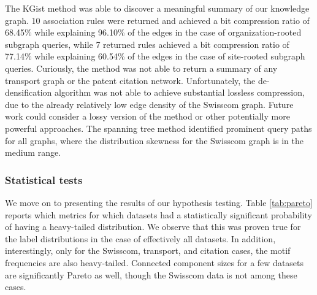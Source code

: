 The KGist method was able to discover a meaningful summary of our knowledge graph. 10 association rules were returned and achieved a bit compression ratio of 68.45\% while explaining 96.10\% of the edges in the case of organization-rooted subgraph queries, while 7 returned rules achieved a bit compression ratio of 77.14\% while explaining 60.54\% of the edges in the case of site-rooted subgraph queries. Curiously, the method was not able to return a summary of any transport graph or the patent citation network. Unfortunately, the de-densification algorithm was not able to achieve substantial lossless compression, due to the already relatively low edge density of the Swisscom graph. Future work could consider a lossy version of the method or other potentially more powerful approaches. The spanning tree method identified prominent query paths for all graphs, where the distribution skewness for the Swisscom graph is in the medium range.

\subsubsection{Statistical tests}

We move on to presenting the results of our hypothesis testing. Table \ref{tab:pareto} reports which metrics for which datasets had a statistically significant probability of having a heavy-tailed distribution. We observe that this was proven true for the label distributions in the case of effectively all datasets. In addition, interestingly, only for the Swisscom, transport, and citation cases, the motif frequencies are also heavy-tailed. Connected component sizes for a few datasets are significantly Pareto as well, though the Swisscom data is not among these cases.

